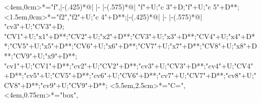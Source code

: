 \begin{multicols}{2}
\begin{exe}
{\begin{xlist}
{				<4em,0cm>*\as{\tsc{[+fr.]}}="f",{\ar@{-}|-(.425)*@{|} |-{\hole} |-(.575)*@{|} "f"+U;"c 3"+D};"f"+U;"c 5"+D**\dir{-};
				<1.5em,0cm>*\as{\tsc{[c.]}}="f2","f2"+U;"c 4"+D**\dir{-};{\ar@{-}|-(.425)*@{|} |-{\hole} |-(.575)*@{|} "cv3"+U;"CV3"+D};
				"CV1"+U;"x1"+D**\dir{-};"CV2"+U;"x2"+D**\dir{-};"CV3"+U;"x3"+D**\dir{-};"CV4"+U;"x4"+D**\dir{-};"CV5"+U;"x5"+D**\dir{-};"CV6"+U;"x6"+D**\dir{-};"CV7"+U;"x7"+D**\dir{-};"CV8"+U;"x8"+D**\dir{-};"CV9"+U;"x9"+D**\dir{-};
				"cv1"+U;"CV1"+D**\dir{-};"cv2"+U;"CV2"+D**\dir{-};"cv3"+U;"CV3"+D**\dir{};"cv4"+U;"CV4"+D**\dir{-};"cv5"+U;"CV5"+D**\dir{-};"cv6"+U;"CV6"+D**\dir{-};"cv7"+U;"CV7"+D**\dir{};"cv8"+U;"CV8"+D**\dir{-};"cv9"+U;"CV9"+D**\dir{};
				<5.5em,2.5cm>*\as{=}="C=",<4em,0.75cm>*="box",
			\endxy}\label{as:faafje/ooje2}
		\end{xlist}}
	\end{exe}
\end{multicols}
